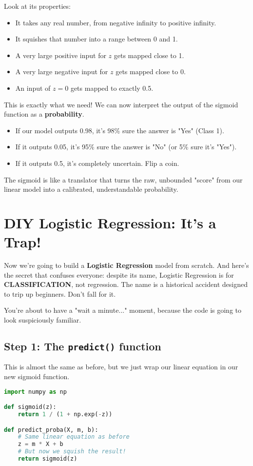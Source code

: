 \documentclass[11pt, letterpaper, openany]{book}
\begin{document}
Look at its properties:
\begin{itemize}
    \item It takes any real number, from negative infinity to positive infinity.
    \item It squishes that number into a range between 0 and 1.
    \item A very large positive input for $z$ gets mapped close to 1.
    \item A very large negative input for $z$ gets mapped close to 0.
    \item An input of $z=0$ gets mapped to exactly 0.5.
\end{itemize}
This is exactly what we need! We can now interpret the output of the sigmoid function as a \textbf{probability}.
\begin{itemize}
    \item If our model outputs 0.98, it's 98\% sure the answer is "Yes" (Class 1).
    \item If it outputs 0.05, it's 95\% sure the answer is "No" (or 5\% sure it's "Yes").
    \item If it outputs 0.5, it's completely uncertain. Flip a coin.
\end{itemize}
The sigmoid is like a translator that turns the raw, unbounded "score" from our linear model into a calibrated, understandable probability.

\section{DIY Logistic Regression: It's a Trap!}

Now we're going to build a \textbf{Logistic Regression} model from scratch. And here's the secret that confuses everyone: despite its name, Logistic Regression is for \textbf{CLASSIFICATION}, not regression. The name is a historical accident designed to trip up beginners. Don't fall for it.

You're about to have a "wait a minute..." moment, because the code is going to look suspiciously familiar.

\subsection{Step 1: The \texttt{predict()} function}

This is almost the same as before, but we just wrap our linear equation in our new sigmoid function.

\begin{lstlisting}[language=Python]
import numpy as np

def sigmoid(z):
    return 1 / (1 + np.exp(-z))

def predict_proba(X, m, b):
    # Same linear equation as before
    z = m * X + b
    # But now we squish the result!
    return sigmoid(z)
\end{lstlisting}
\end{document}
